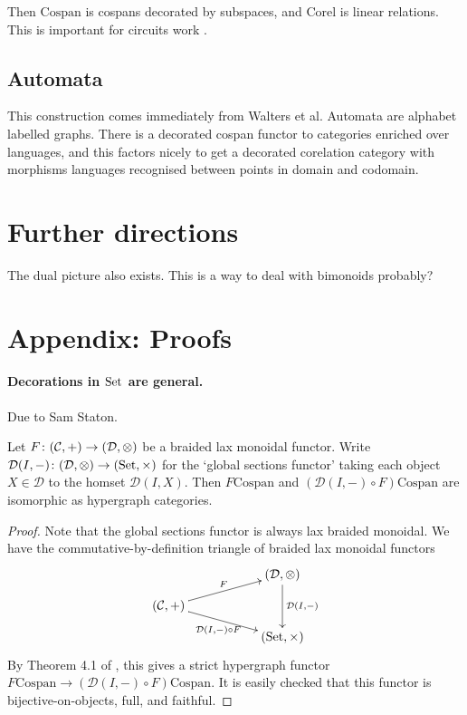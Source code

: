 Then $\mathrm{Cospan}$ is cospans decorated by subspaces, and $\mathrm{Corel}$
is linear relations. This is important for circuits work \cite{BF,BSZ}.

\subsection{Automata}
This construction comes immediately from Walters et al. Automata are alphabet
labelled graphs. There is a decorated cospan functor to categories enriched over
languages, and this factors nicely to get a decorated corelation category with
morphisms languages recognised between points in domain and codomain.


\section{Further directions}

The dual picture also exists. This is a way to deal with bimonoids probably?

\section{Appendix: Proofs} \label{sec:proofs}

\paragraph{Decorations in $\mathrm{Set}$ are general.} \label{ssec.setdecorations}

Due to Sam Staton.

\begin{proposition} \label{prop.setdecorations}
  Let $F{\colon} (\mathcal C, +) \to (\mathcal D, \otimes)$ be a braided lax monoidal
  functor. Write $\mathcal D(I,-){\colon} (\mathcal D, \otimes) \to (\mathrm{Set},
  \times)$ for the `global sections functor' taking each object $X \in \mathcal
  D$ to the homset $\mathcal D(I,X)$. Then $F\mathrm{Cospan}$ and $(\mathcal
  D(I,-)\circ F)\mathrm{Cospan}$ are isomorphic as hypergraph categories.
\end{proposition}
\begin{proof}
  Note that the global sections functor is always lax braided monoidal. We have
  the commutative-by-definition triangle of braided lax monoidal functors
  \[
    \xymatrixrowsep{2ex}
    \xymatrix{
      && (\mathcal D,\otimes) \ar[dd]^{\mathcal D(I,-)} \\
      (\mathcal C,+) \ar[urr]^{F} \ar[drr]_{\mathcal D(I,-)\circ F} \\
      && (\Set, \times)
    }
  \]
  By Theorem 4.1 of \cite{F}, this gives a strict hypergraph functor
  $F\mathrm{Cospan} \to (\mathcal D(I,-)\circ F)\mathrm{Cospan}$. It is easily
  checked that this functor is bijective-on-objects, full, and faithful.
\end{proof}

